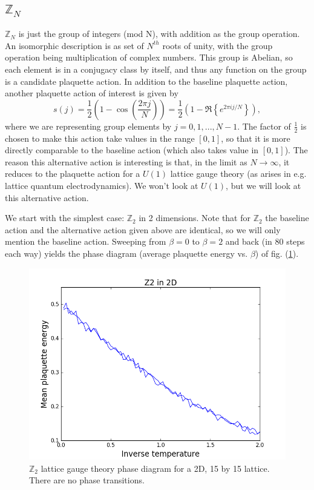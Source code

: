 \documentclass[9pt,twocolumn,twoside]{article}
\begin{document}
\subsection{$\mathbb{Z}_N$}
$\mathbb{Z}_N$ is just the group of integers (mod N), with addition as the group operation.  An isomorphic description is as set of $N^{th}$ roots of unity, with the group operation being multiplication of complex numbers.  This group is Abelian, so each element is in a conjugacy class by itself, and thus any function on the group is a candidate plaquette action.  In addition to the baseline plaquette action, another plaquette action of interest is given by 
\[s(j) = \frac{1}{2}\left(1-\cos\left(\frac{2\pi j}{N}\right)\right) = \frac{1}{2}\left(1 - \Re{\left\{ e^{2\pi i j/N} \right\}}\right),\]
where we are representing group elements by $j=0,1,...,N-1$.  The factor of $\frac{1}{2}$ is chosen to make this action take values in the range $[0,1]$, so that it is more directly comparable to the baseline action (which also takes value in $[0,1]$).  The reason this alternative action is interesting is that, in the limit as $N\rightarrow \infty$, it reduces to the plaquette action for a $U(1)$ lattice gauge theory (as arises in e.g. lattice quantum electrodynamics).  We won't look at $U(1)$, but we will look at this alternative action.  

We start with the simplest case: $\mathbb{Z}_2$ in 2 dimensions.  Note that for $\mathbb{Z}_2$ the baseline action and the alternative action given above are identical, so we will only mention the baseline action.  Sweeping from $\beta=0$ to $\beta=2$ and back (in 80 steps each way) yields the phase diagram (average plaquette energy vs. $\beta$) of fig. (\ref{z2,2d}).
\begin{figure}[h!]
	\begin{centering}
	\includegraphics[width=\columnwidth]{z2,2d}
	\caption[$\mathbb{Z}_2$ lattice gauge theory phase diagram for a 2D lattice.]{$\mathbb{Z}_2$ lattice gauge theory phase diagram for a 2D, 15 by 15 lattice.  There are no phase transitions.}
	\label{z2,2d}
	\end{centering}
\end{figure}
\end{document}
